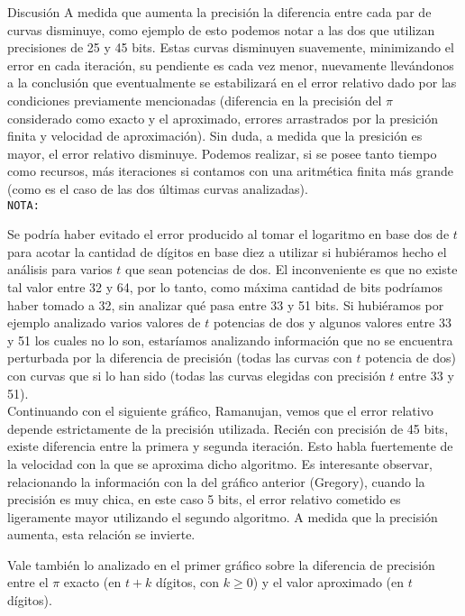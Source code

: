 \begin{section}{Discusión}
	A medida que aumenta la precisión la diferencia entre cada par de curvas disminuye, como ejemplo de esto podemos notar a las dos que utilizan precisiones de 25 y 45 bits. Estas curvas disminuyen suavemente, minimizando el error en cada iteración, su pendiente es cada vez menor, nuevamente llevándonos a la conclusión que eventualmente se estabilizará en el error relativo dado por las condiciones previamente mencionadas (diferencia en la precisión del $\pi$ considerado como exacto y el aproximado, errores arrastrados por la presición finita y velocidad de aproximación). Sin duda, a medida que la presición es mayor, el error relativo disminuye. Podemos realizar, si se posee tanto tiempo como recursos, más iteraciones si contamos con una aritmética finita más grande (como es el caso de las dos últimas curvas analizadas).\\
	
	
	\texttt{NOTA:}
	
	Se podría haber evitado el error producido al tomar el logaritmo en base dos de $t$ para acotar la cantidad de dígitos en base diez a utilizar si hubiéramos hecho el análisis para varios $t$ que sean potencias de dos. El inconveniente es que no existe tal valor entre 32 y 64, por lo tanto, como máxima cantidad de bits podríamos haber tomado a 32, sin analizar qué pasa entre 33 y 51 bits. Si hubiéramos por ejemplo analizado varios valores de $t$ potencias de dos y algunos valores entre 33 y 51 los cuales no lo son, estaríamos analizando información que no se encuentra perturbada por la diferencia de precisión (todas las curvas con $t$ potencia de dos) con curvas que si lo han sido (todas las curvas elegidas con precisión $t$ entre 33 y 51).\\
	
	Continuando con el siguiente gráfico, Ramanujan, vemos que el error relativo depende estrictamente de la precisión utilizada. Recién con precisión de 45 bits, existe diferencia entre la primera y segunda iteración. Esto habla fuertemente de la velocidad con la que se aproxima dicho algoritmo. Es interesante observar, relacionando la información con la del gráfico anterior (Gregory), cuando la precisión es muy chica, en este caso 5 bits, el error relativo cometido es ligeramente mayor utilizando el segundo algoritmo. A medida que la precisión aumenta, esta relación se invierte.
	
	Vale también lo analizado en el primer gráfico sobre la diferencia de precisión entre el $\pi$ exacto (en $t+k$ dígitos, con $k\geq0$) y el valor aproximado (en $t$ dígitos).\\
	

\end{section}
